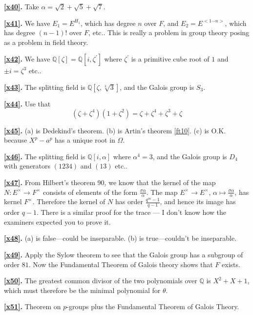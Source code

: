 \documentclass[a4paper,11pt,final,openany]{memoir}
\theoremstyle{nonumberplain}
\begin{document}
\medskip\noindent\textbf{\ref{x40}.} Take $\alpha=\sqrt{2}+\sqrt{5}+\sqrt{7}$.

\medskip\noindent\textbf{\ref{x41}.} We have $E_{1}=E^{H_{1}}$, which has
degree $n$ over $F$, and $E_{2}=E^{<1\cdots n>}$, which has degree $(n-1)!$
over $F$, etc.. This is really a problem in group theory posing as a problem
in field theory.

\medskip\noindent\textbf{\ref{x42}.} We have ${\mathbb{Q}}[\zeta]={\mathbb{Q}%
}[i,\zeta^{\prime}]$ where $\zeta^{\prime}$ is a primitive cube root of $1 $
and $\pm i=\zeta^{3}$ etc..

\medskip\noindent\textbf{\ref{x43}.} The splitting field is ${\mathbb{Q}%
}[\zeta,\sqrt[3]{3}]$, and the Galois group is $S_{3}$.

\medskip\noindent\textbf{\ref{x44}.} Use that%
\[
(\zeta+\zeta^{4})(1+\zeta^{2})=\zeta+\zeta^{4}+\zeta^{3}+\zeta
\]


\medskip\noindent\textbf{\ref{x45}.} (a) is Dedekind's theorem. (b) is Artin's
theorem \ref{ft10}. (c) is O.K. because $X^{p}-a^{p}$ has a unique root in
$\Omega$.

\medskip\noindent\textbf{\ref{x46}.} The splitting field is ${\mathbb{Q}%
}[i,\alpha]$ where $\alpha^{4}=3$, and the Galois group is $D_{4}$ with
generators $(1234)$ and $(13)$ etc..

\medskip\noindent\textbf{\ref{x47}.} From Hilbert's theorem 90, we know that
the kernel of the map $N\colon E^{\times}\rightarrow F^{\times}$ consists of
elements of the form $\frac{\sigma\alpha}{\alpha}$. The map $E^{\times
}\rightarrow E^{\times}$, $\alpha\mapsto\frac{\sigma\alpha}{\alpha}$, has
kernel $F^{\times}$. Therefore the kernel of $N$ has order $\frac{q^{m}%
-1}{q-1}$, and hence its image has order $q-1$. There is a similar proof for
the trace --- I don't know how the examiners expected you to prove it.

\medskip\noindent\textbf{\ref{x48}.} (a) is false---could be inseparable. (b)
is true---couldn't be inseparable.

\medskip\noindent\textbf{\ref{x49}.} Apply the Sylow theorem to see that the
Galois group has a subgroup of order $81$. Now the Fundamental Theorem of
Galois theory shows that $F$ exists.

\medskip\noindent\textbf{\ref{x50}.} The greatest common divisor of the two
polynomials over ${\mathbb{Q}}$ is $X^{2}+X+1$, which must therefore be the
minimal polynomial for $\theta$.

\medskip\noindent\textbf{\ref{x51}.} Theorem on $p$-groups plus the
Fundamental Theorem of Galois Theory.
\end{document}
